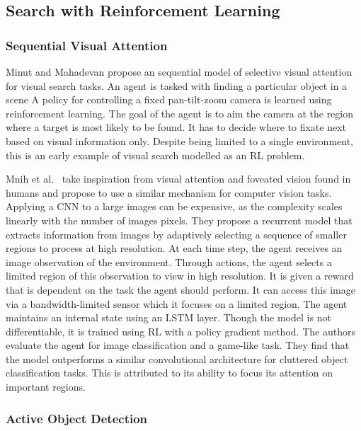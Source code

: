 
\subsection{Search with Reinforcement Learning}

\subsubsection{Sequential Visual Attention}

Minut and Mahadevan\cite{minut_mahadevan_2001} propose an sequential model of selective visual attention for visual search tasks.
An agent is tasked with finding a particular object in a scene
A policy for controlling a fixed pan-tilt-zoom camera is learned using reinforcement learning.
The goal of the agent is to aim the camera at the region where a target is most likely to be found.
It has to decide where to fixate next based on visual information only.
Despite being limited to a single environment, this is an early example of visual search modelled as an RL problem.

Mnih et al.~\cite{mnih_attention_2014} take inspiration from visual attention and foveated vision found in humans and propose to use a similar mechanism for computer vision tasks.
Applying a CNN to a large images can be expensive, as the complexity scales linearly with the number of images pixels.
They propose a recurrent model that extracts information from images by adaptively selecting a sequence of smaller regions to process at high resolution.
At each time step, the agent receives an image observation of the environment.
Through actions, the agent selects a limited region of this observation to view in high resolution.
It is given a reward that is dependent on the task the agent should perform.
It can access this image via a bandwidth-limited sensor which it focuses on a limited region.
The agent maintains an internal state using an LSTM layer.
Though the model is not differentiable, it is trained using RL with a policy gradient method.
The authors evaluate the agent for image classification and a game-like task.
They find that the model outperforms a similar convolutional architecture for cluttered object classification tasks.
This is attributed to its ability to focus its attention on important regions.

\subsubsection{Active Object Detection}

